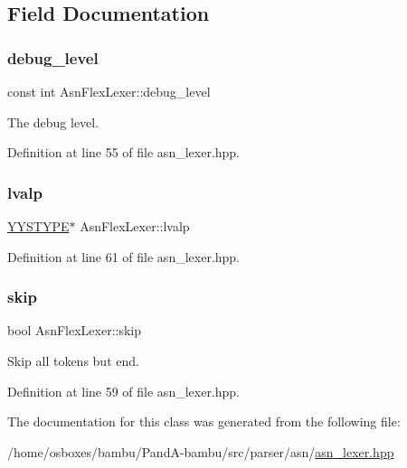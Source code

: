 \subsection{Field Documentation}
\mbox{\label{classAsnFlexLexer_a309e9724047263d552b4cd868c9c48b4}} 
\subsubsection{\texorpdfstring{debug\+\_\+level}{debug\_level}}
{\footnotesize\ttfamily const int Asn\+Flex\+Lexer\+::debug\+\_\+level\hspace{0.3cm}{\ttfamily [protected]}}



The debug level. 



Definition at line 55 of file asn\+\_\+lexer.\+hpp.

\mbox{\label{classAsnFlexLexer_a9d5000fe497b3c40a3c4744645202b4b}} 
\subsubsection{\texorpdfstring{lvalp}{lvalp}}
{\footnotesize\ttfamily \hyperlink{asn__parser_8cpp_a2ceb5b985e149f18e018b142cfdd7264}{Y\+Y\+S\+T\+Y\+PE}$\ast$ Asn\+Flex\+Lexer\+::lvalp}



Definition at line 61 of file asn\+\_\+lexer.\+hpp.

\mbox{\label{classAsnFlexLexer_a310fa2546b2c42caf74181410e14aef8}} 
\subsubsection{\texorpdfstring{skip}{skip}}
{\footnotesize\ttfamily bool Asn\+Flex\+Lexer\+::skip}



Skip all tokens but end. 



Definition at line 59 of file asn\+\_\+lexer.\+hpp.



The documentation for this class was generated from the following file\+:\begin{DoxyCompactItemize}
\item 
/home/osboxes/bambu/\+Pand\+A-\/bambu/src/parser/asn/\hyperlink{asn__lexer_8hpp}{asn\+\_\+lexer.\+hpp}\end{DoxyCompactItemize}
